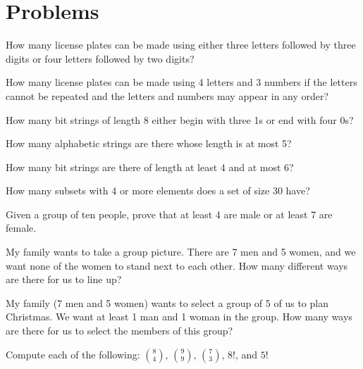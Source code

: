 \section{Problems}

\begin{pro}
How many license plates can be made using either three letters
followed by three digits or four letters followed by two digits?
\end{pro}
\begin{pro}
How many license plates can be made using 4 letters and 3 numbers
if the letters cannot be repeated and the letters and numbers may appear in any order?
\end{pro}
\begin{pro} 
How many bit strings of length 8 either begin with 
three 1s or end with four 0s?
\end{pro}
\begin{pro} 
How many alphabetic strings are there whose length is at most 5?
\end{pro}
\begin{pro}
How many bit strings are there of length at least 4 and at most 6?
\end{pro}
\begin{pro}
How many subsets with 4 or more elements does a set of size 30 have?
\end{pro}
\begin{pro} 
Given a group of ten people, prove that at least 4 are male
or at least 7 are female.
\end{pro}
\begin{pro} 
My family wants to take a group picture.  There are 7 men
and 5 women, and we want none of the women to stand next to 
each other.  How many different ways are there for us to 
line up?
\end{pro}
\begin{pro} 
My family (7 men and 5 women) wants to select a group of
5 of us to plan Christmas.  We want at least
1 man and 1 woman in the group.  How many ways are
there for us to select the members of this group?
\end{pro}
\begin{pro} 
Compute each of the following:
$\binom{8}{4}$, $\binom{9}{9}$, $\binom{7}{3}$, $8!$, and $5!$
\end{pro}
